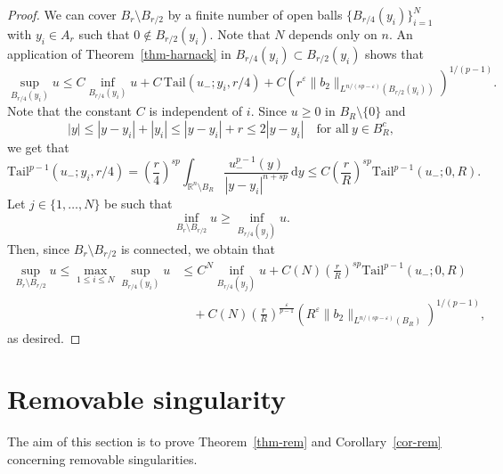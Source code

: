 \documentclass[11pt]{amsart}
\theoremstyle{plain}
\theoremstyle{definition}
\numberwithin{equation}{section}
\begin{document}
\begin{proof}
We can cover $B_r \setminus B_{r/2}$ by a finite number of open balls $\{B_{r/4}(y_i)\}_{i=1}^N$ with $y_i \in A_r$ such that $0 \notin B_{r/2}(y_i)$. Note that $N$ depends only on $n$. An application of Theorem~\ref{thm-harnack} in $B_{r/4}(y_i) \subset B_{r/2}(y_i)$ shows that
\begin{equation*}
\sup_{B_{r/4}(y_i)}{u} \leq C \inf_{B_{r/4}(y_i)}{u} + C\, \mathrm{Tail}(u_-; y_i, r/4) + C \left( r^\varepsilon \|b_2\|_{L^{n/(sp-\varepsilon)}(B_{r/2}(y_i))} \right)^{1/(p-1)}.
\end{equation*}
Note that the constant $C$ is independent of $i$. Since $u \geq 0$ in $B_R \setminus \{0\}$ and
\begin{equation*}
|y| \leq |y-y_i|+|y_i| \leq |y-y_i|+r \leq 2|y-y_i| \quad\text{for all}~y \in B_R^c,
\end{equation*}
we get that
\begin{equation*}
\mathrm{Tail}^{p-1}(u_-; y_i, r/4) = \left( \frac{r}{4} \right)^{sp} \int_{\mathbb{R}^n \setminus B_R} \frac{u_-^{p-1}(y)}{|y-y_i|^{n+sp}} \,\mathrm{d}y \leq C \left( \frac{r}{R} \right)^{sp} \mathrm{Tail}^{p-1}(u_-; 0, R).
\end{equation*}
Let $j \in \{1, \dots, N\}$ be such that
\begin{equation*}
\inf_{B_r \setminus B_{r/2}}{u} \geq \inf_{B_{r/4}(y_j)}{u}.
\end{equation*}
Then, since $B_r \setminus B_{r/2}$ is connected, we obtain that
\begin{equation*}
\begin{split}
\sup_{B_r \setminus B_{r/2}}u \leq \max_{1\leq i \leq N} \sup_{B_{r/4}(y_i)}u
&\leq C^N \inf_{B_{r/4}(y_j)} {u} + C(N) \left( \frac{r}{R} \right)^{sp} \mathrm{Tail}^{p-1}(u_-; 0, R) \\
&\quad + C(N) \left(\frac{r}{R}\right)^{\frac{\varepsilon}{p-1}}\left( R^\varepsilon \|b_2\|_{L^{n/(sp-\varepsilon)}(B_R)} \right)^{1/(p-1)},
\end{split}
\end{equation*}
as desired.
\end{proof}





\section{Removable singularity}\label{sec-removable}

The aim of this section is to prove Theorem~\ref{thm-rem} and Corollary~\ref{cor-rem} concerning removable singularities.
\end{document}
